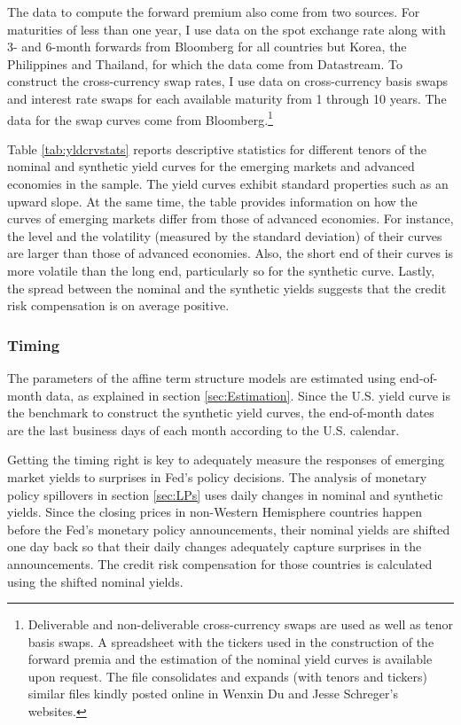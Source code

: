 {The data to compute the forward premium also come from two sources. 
For maturities of less than one year, I use data on the spot exchange rate along with 3- and 6-month forwards from Bloomberg for all countries but Korea, the Philippines and Thailand, for which the data come from Datastream. 
To construct the cross-currency swap rates, I use data on cross-currency basis swaps and interest rate swaps for each available maturity from 1 through 10 years. 
The data for the swap curves come from Bloomberg.\footnote{Deliverable and non-deliverable cross-currency swaps are used as well as tenor basis swaps. A spreadsheet with the tickers used in the construction of the forward premia and the estimation of the nominal yield curves is available upon request. The file consolidates and expands (with tenors and tickers) similar files kindly posted online in Wenxin Du and Jesse Schreger's websites.}

Table \ref{tab:yldcrvstats} reports descriptive statistics for different tenors of the nominal and synthetic yield curves for the emerging markets and advanced economies in the sample. 
The yield curves exhibit standard properties such as an upward slope. 
At the same time, the table provides information on how the curves of emerging markets differ from those of advanced economies. 
For instance, the level and the volatility (measured by the standard deviation) of their curves are larger than those of advanced economies. 
Also, the short end of their curves is more volatile than the long end, particularly so for the synthetic curve.
Lastly, the spread between the nominal and the synthetic yields suggests that the credit risk compensation is on average positive. 




\subsubsection{Timing}
The parameters of the affine term structure models are estimated using end-of-month data, as explained in section \ref{sec:Estimation}. 
Since the U.S. yield curve is the benchmark to construct the synthetic yield curves, the end-of-month dates are the last business days of each month according to the U.S. calendar.

Getting the timing right is key to adequately measure the responses of emerging market yields to surprises in Fed's policy decisions.
The analysis of monetary policy spillovers in section \ref{sec:LPs} uses daily changes in nominal and synthetic yields. 
Since the closing prices in non-Western Hemisphere countries happen before the Fed's monetary policy announcements, their nominal yields are shifted one day back so that their daily changes adequately capture surprises in the announcements. 
The credit risk compensation for those countries is calculated using the shifted nominal yields.


}{}	%


